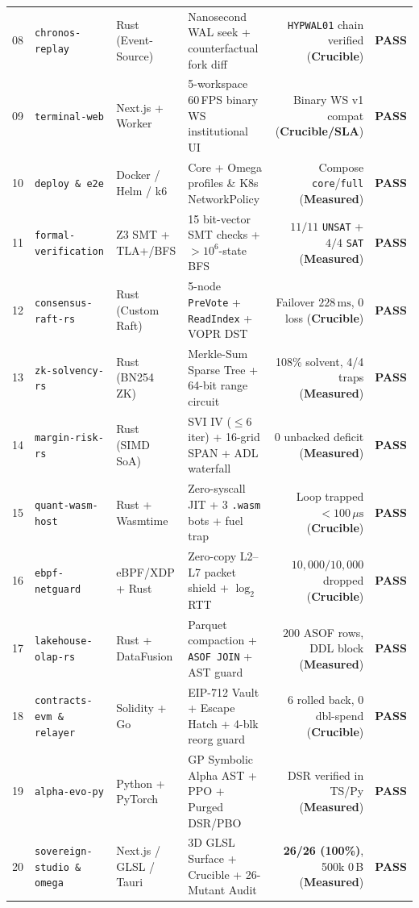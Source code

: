 \documentclass[10pt,twocolumn]{article}
\begin{document}
\begin{table}[t]
\begin{tabular}{@{}clllrr@{}}
08 & \texttt{chronos-replay} & Rust (Event-Source) & Nanosecond WAL seek + counterfactual fork diff & \texttt{HYPWAL01} chain verified (\textbf{Crucible}) & \textbf{PASS} \\
09 & \texttt{terminal-web} & Next.js + Worker & 5-workspace 60\,FPS binary WS institutional UI & Binary WS v1 compat (\textbf{Crucible/SLA}) & \textbf{PASS} \\
10 & \texttt{deploy \& e2e} & Docker / Helm / k6 & Core + Omega profiles \& K8s NetworkPolicy & Compose \texttt{core}/\texttt{full} (\textbf{Measured}) & \textbf{PASS} \\
11 & \texttt{formal-verification} & Z3 SMT + TLA+/BFS & 15 bit-vector SMT checks + $>10^6$-state BFS & $11/11$ \texttt{UNSAT} + $4/4$ \texttt{SAT} (\textbf{Measured}) & \textbf{PASS} \\
12 & \texttt{consensus-raft-rs} & Rust (Custom Raft) & 5-node \texttt{PreVote} + \texttt{ReadIndex} + VOPR DST & Failover $228\,\text{ms}$, $0$ loss (\textbf{Crucible}) & \textbf{PASS} \\
13 & \texttt{zk-solvency-rs} & Rust (BN254 ZK) & Merkle-Sum Sparse Tree + 64-bit range circuit & 108\% solvent, 4/4 traps (\textbf{Measured}) & \textbf{PASS} \\
14 & \texttt{margin-risk-rs} & Rust (SIMD SoA) & SVI IV ($\le 6$ iter) + 16-grid SPAN + ADL waterfall & $0$ unbacked deficit (\textbf{Measured}) & \textbf{PASS} \\
15 & \texttt{quant-wasm-host} & Rust + Wasmtime & Zero-syscall JIT + 3 \texttt{.wasm} bots + fuel trap & Loop trapped $<100\,\mu\text{s}$ (\textbf{Crucible}) & \textbf{PASS} \\
16 & \texttt{ebpf-netguard} & eBPF/XDP + Rust & Zero-copy L2--L7 packet shield + $\log_2$ RTT & $10{,}000/10{,}000$ dropped (\textbf{Crucible}) & \textbf{PASS} \\
17 & \texttt{lakehouse-olap-rs} & Rust + DataFusion & Parquet compaction + \texttt{ASOF JOIN} + AST guard & $200$ ASOF rows, DDL block (\textbf{Measured}) & \textbf{PASS} \\
18 & \texttt{contracts-evm \& relayer} & Solidity + Go & EIP-712 Vault + Escape Hatch + 4-blk reorg guard & $6$ rolled back, $0$ dbl-spend (\textbf{Crucible}) & \textbf{PASS} \\
19 & \texttt{alpha-evo-py} & Python + PyTorch & GP Symbolic Alpha AST + PPO + Purged DSR/PBO & DSR verified in TS/Py (\textbf{Measured}) & \textbf{PASS} \\
20 & \texttt{sovereign-studio \& omega} & Next.js / GLSL / Tauri & 3D GLSL Surface + Crucible + 26-Mutant Audit & \textbf{26/26 (100\%)}, 500k $0$\,B (\textbf{Measured}) & \textbf{PASS} \\
\bottomrule
\end{tabular}
\end{table}
\end{document}
